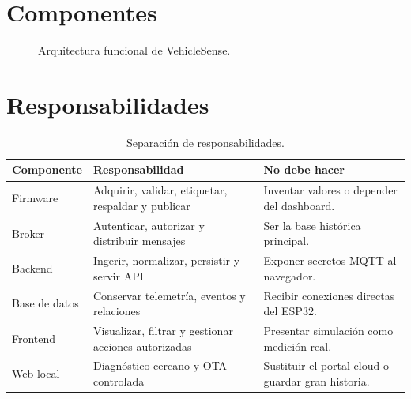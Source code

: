 \documentclass[11pt,a4paper,oneside]{report}
\begin{document}
\section{Componentes}
\begin{figure}[H]\centering
{}
\caption{Arquitectura funcional de VehicleSense.}
\end{figure}

\section{Responsabilidades}
\begin{table}[H]\centering
\caption{Separación de responsabilidades.}
\begin{tabularx}{\textwidth}{@{}l Y Y@{}}
\toprule
\textbf{Componente} & \textbf{Responsabilidad} & \textbf{No debe hacer}\\
\midrule
Firmware & Adquirir, validar, etiquetar, respaldar y publicar & Inventar valores o depender del dashboard.\\
Broker & Autenticar, autorizar y distribuir mensajes & Ser la base histórica principal.\\
Backend & Ingerir, normalizar, persistir y servir API & Exponer secretos MQTT al navegador.\\
Base de datos & Conservar telemetría, eventos y relaciones & Recibir conexiones directas del ESP32.\\
Frontend & Visualizar, filtrar y gestionar acciones autorizadas & Presentar simulación como medición real.\\
Web local & Diagnóstico cercano y OTA controlada & Sustituir el portal cloud o guardar gran historia.\\
\bottomrule
\end{tabularx}
\end{table}
\end{document}
